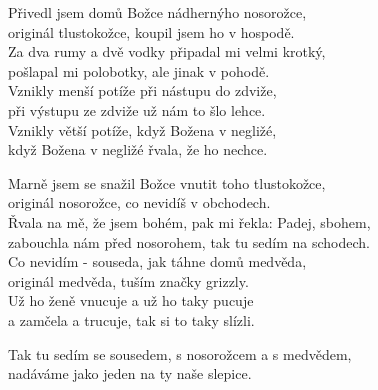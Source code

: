 
\ve{}
Přivedl jsem domů Božce nádhernýho nosorožce,\\
originál tlustokožce, koupil jsem ho v hospodě.\\
Za dva rumy a dvě vodky připadal mi velmi krotký,\\
pošlapal mi polobotky, ale jinak v pohodě.\\
Vznikly menší potíže při nástupu do zdviže,\\
při výstupu ze zdviže už nám to šlo lehce.\\
Vznikly větší potíže, když Božena v negližé,\\
když Božena v negližé řvala, že ho nechce. 

\ve{}
Marně jsem se snažil Božce vnutit toho tlustokožce,\\
originál nosorožce, co nevidíš v obchodech.\\
Řvala na mě, že jsem bohém, pak mi řekla: Padej, sbohem,\\
zabouchla nám před nosorohem, tak tu sedím na schodech.\\
Co nevidím - souseda, jak táhne domů medvěda,\\
originál medvěda, tuším značky grizzly.\\
Už ho ženě vnucuje a už ho taky pucuje\\
a zamčela a trucuje, tak si to taky slízli. 

\ve{}
Tak tu sedím se sousedem, s nosorožcem a s medvědem,\\
nadáváme jako jeden na ty naše slepice. 

\esong